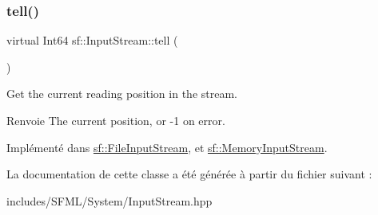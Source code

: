 \mbox{\label{classsf_1_1InputStream_a599515b9ccdbddb6fef5a98424fd559c}} 
\subsubsection{\texorpdfstring{tell()}{tell()}}
{\footnotesize\ttfamily virtual Int64 sf\+::\+Input\+Stream\+::tell (\begin{DoxyParamCaption}{ }\end{DoxyParamCaption})\hspace{0.3cm}{\ttfamily [pure virtual]}}



Get the current reading position in the stream. 

\begin{DoxyReturn}{Renvoie}
The current position, or -\/1 on error. 
\end{DoxyReturn}


Implémenté dans \hyperlink{classsf_1_1FileInputStream_a768c5fdb3be79e2d71d1bce911f8741c}{sf\+::\+File\+Input\+Stream}, et \hyperlink{classsf_1_1MemoryInputStream_a7ad4bdf721f29de8f66421ff29e23ee4}{sf\+::\+Memory\+Input\+Stream}.



La documentation de cette classe a été générée à partir du fichier suivant \+:\begin{DoxyCompactItemize}
\item 
includes/\+S\+F\+M\+L/\+System/Input\+Stream.\+hpp\end{DoxyCompactItemize}
